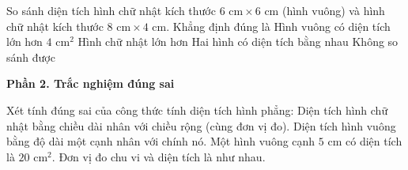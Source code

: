 \begin{ex} %
So sánh diện tích hình chữ nhật kích thước $6\text{ cm} \times 6\text{ cm}$ (hình vuông) và hình chữ nhật kích thước $8\text{ cm} \times 4\text{ cm}$. Khẳng định đúng là
\choice
{\True Hình vuông có diện tích lớn hơn $4\text{ cm}^2$}
{Hình chữ nhật lớn hơn}
{Hai hình có diện tích bằng nhau}
{Không so sánh được}
\end{ex}

\textbf{Phần 2. Trắc nghiệm đúng sai}

\begin{ex} %
Xét tính đúng sai của công thức tính diện tích hình phẳng:
\choiceTF
{\True Diện tích hình chữ nhật bằng chiều dài nhân với chiều rộng (cùng đơn vị đo).}
{\True Diện tích hình vuông bằng độ dài một cạnh nhân với chính nó.}
{Một hình vuông cạnh $5\text{ cm}$ có diện tích là $20\text{ cm}^2$.}
{Đơn vị đo chu vi và diện tích là như nhau.}
\end{ex}

